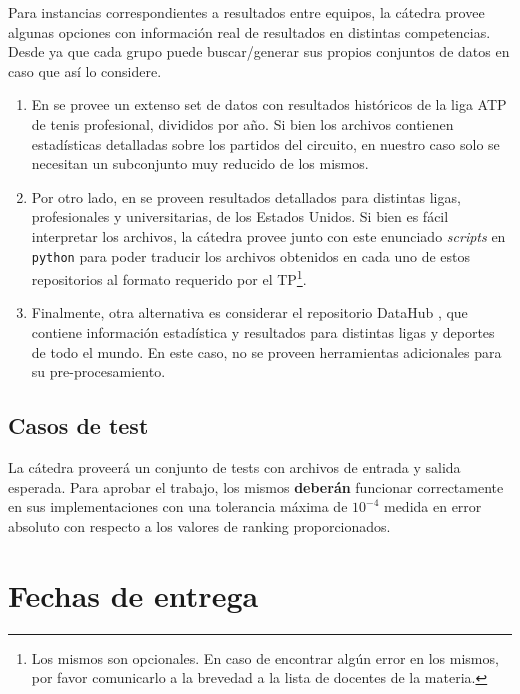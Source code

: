 \documentclass[11pt,a4paper]{article}
\begin{document}
Para instancias correspondientes a resultados entre equipos, la cátedra provee algunas opciones con información real de resultados en distintas competencias.
Desde ya que cada grupo puede buscar/generar sus propios conjuntos de datos en caso que así lo considere.
\begin{enumerate}
	\item En \cite{ATP} se provee un extenso set de datos con resultados históricos de la liga ATP de tenis profesional, divididos por año. Si bien los archivos contienen
	estadísticas detalladas sobre los partidos del circuito, en nuestro caso solo se necesitan un subconjunto muy reducido de los mismos. 
	\item Por otro lado, en \cite{Massey} se proveen resultados detallados para distintas ligas, profesionales y universitarias, de los Estados Unidos. Si bien es fácil interpretar los archivos, la cátedra
	provee junto con este enunciado \textit{scripts} en \texttt{python} para poder traducir los archivos obtenidos en cada uno de estos repositorios al formato requerido por el TP\footnote{Los mismos son opcionales. En caso de encontrar algún error en los mismos, por favor comunicarlo a la brevedad a la lista de docentes de la materia.}.
	\item Finalmente, otra alternativa es considerar el 
	repositorio DataHub \cite{datahub}, que contiene información estadística y resultados para distintas ligas y deportes de todo el mundo. En este caso, no se proveen herramientas adicionales para su pre-procesamiento.
\end{enumerate}


\subsection*{Casos de test}

La cátedra proveerá un conjunto de tests con archivos de entrada y salida esperada. 
Para aprobar el trabajo, los mismos \textbf{deberán} funcionar correctamente en sus implementaciones con una tolerancia máxima de $10^{-4}$ medida en error absoluto con respecto a los valores de ranking proporcionados.




\section*{Fechas de entrega}
\end{document}
